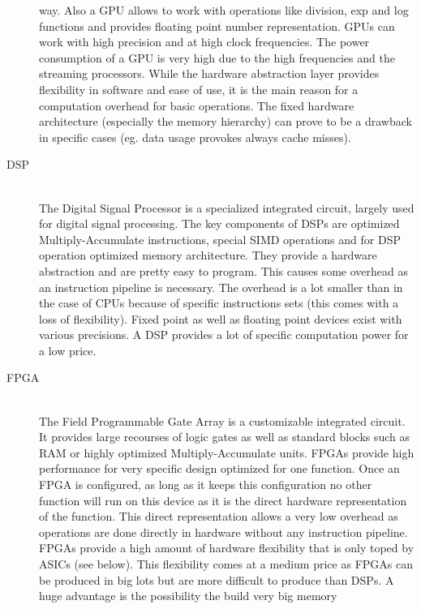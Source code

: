 \documentclass[mscthesis]{usiinfthesis}
\begin{document}
\begin{description}
        way. Also a GPU allows to work with operations like division, exp and
        log functions and provides floating point number representation. GPUs
        can work with high precision and at high clock frequencies. The power
        consumption of a GPU is very high due to the high frequencies and the
        streaming processors. While the hardware abstraction layer provides
        flexibility in software and ease of use, it is the main reason for
        a computation overhead for basic operations. The fixed hardware
        architecture (especially the memory hierarchy) can prove to be
        a drawback in specific cases (eg. data usage provokes always cache
        misses).
    \item[DSP] \hfill \\
        The Digital Signal Processor is a specialized integrated circuit,
        largely used for digital signal processing. The key components of DSPs
        are optimized Multiply-Accumulate instructions, special SIMD operations
        and for DSP operation optimized memory architecture. They provide
        a hardware abstraction and are pretty easy to program. This causes
        some overhead as an instruction pipeline is necessary. The overhead is
        a lot smaller than in the case of CPUs because of specific instructions
        sets (this comes with a loss of flexibility). Fixed point as well as
        floating point devices exist with various precisions. A DSP provides
        a lot of specific computation power for a low price.
    \item[FPGA] \hfill \\
        The Field Programmable Gate Array is a customizable integrated circuit.
        It provides large recourses of logic gates as well as standard blocks
        such as RAM or highly optimized Multiply-Accumulate units. FPGAs
        provide high performance for very specific design optimized for one
        function. Once an FPGA is configured, as long as it keeps this
        configuration no other function will run on this device as it is the
        direct hardware representation of the function. This direct
        representation allows a very low overhead as operations are done
        directly in hardware without any instruction pipeline. FPGAs provide
        a high amount of hardware flexibility that is only toped by ASICs (see
        below). This flexibility comes at a medium price as FPGAs can be
        produced in big lots but are more difficult to produce than DSPs.
        A huge advantage is the possibility the build very big memory

\end{description}
\end{document}
